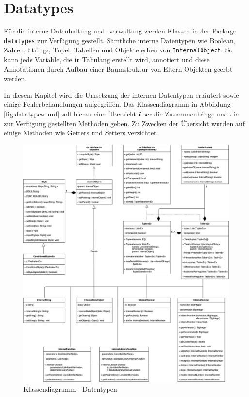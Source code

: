 \pagebreak

\section{Datatypes}

Für die interne Datenhaltung und -verwaltung werden Klassen in der
Package \lstinline{datatypes} zur Verfügung gestellt. Sämtliche
interne Datentypen wie Boolean, Zahlen, Strings, Tupel, Tabellen
und Objekte erben von \lstinline{InternalObject}. So kann jede Variable, die
in Tabulang erstellt wird, annotiert und diese Annotationen durch
Aufbau einer Baumstruktur von Eltern-Objekten geerbt werden.

In diesem Kapitel wird die Umsetzung der internen Datentypen erläutert
sowie einige Fehlerbehandlungen aufgegriffen. Das Klassendiagramm in 
Abbildung \ref{fig:datatypes-uml} soll hierzu eine Übersicht über die
Zusammenhänge und die zur Verfügung gestellten Methoden geben. Zu Zwecken
der Übersicht wurden auf einige Methoden wie Getters und Setters verzichtet.

\begin{figure}[]
\centering
\includegraphics[width=\textwidth]{images/datatypes-uml.png}
\caption{Klassendiagramm - Datentypen}
\end{figure}\label{fig:datatypes-uml}


